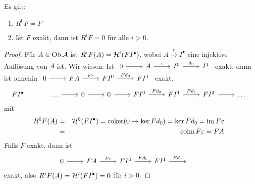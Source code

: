 \begin{bem}\label{8.2}
	Es gilt:
	\begin{enumerate}[label= \alph*)]
		\item $R^0F=F$
		\item Ist $F$ exakt, dann ist $R^iF=0$ für alle $i >0$.
	\end{enumerate}
\end{bem}
\begin{proof}
	Für $A\in \text{Ob}\,\mathcal{A}$ ist $R^iF(A) = \mathcal{H}^i(FI^\bullet)$, wobei $A\xrightarrow{\epsilon} I^\bullet$ eine injektive Auflösung von $A$ ist. Wir wissen: Ist $\begin{tikzcd}
	0 \arrow{r} & A \arrow{r}{\epsilon} & I^0 \arrow{r}{d_0} & I^1
	\end{tikzcd}$ exakt, dann ist ohnehin $\begin{tikzcd}
	0 \arrow{r} & FA \arrow{r}{F\epsilon} & FI^0 \arrow{r}{Fd_0} & FI^1
	\end{tikzcd}$ exakt.
	$$\begin{tikzcd}
	FI^\bullet: & \ldots \arrow{r} & 0 \arrow{r} & 0 \arrow{r}& FI^0 \arrow{r}{Fd_0} & FI^1\arrow{r}{Fd_1}& FI^2\arrow{r} & \ldots
	\end{tikzcd}$$
	mit \begin{eqnarray*}
		R^0F(A) &=& \mathcal{H}^0(FI^\bullet) = \operatorname{coker}(0 \rightarrow \ker Fd_0) = \ker Fd_0
		= \operatorname{im} F\varepsilon\\
		&=& \operatorname{coim} F\varepsilon = FA
	\end{eqnarray*}
	Falls $F$ exakt, dann ist 
	$$\begin{tikzcd}
	0\arrow{r} & FA \arrow{r}{F\epsilon} & FI^0 \arrow{r}{Fd_0} & FI^1\arrow{r}{Fd_1}& \ldots
	\end{tikzcd}$$
	exakt, also $R^iF(A) = \mathcal{H}^i(FI^\bullet) = 0$ für $i>0$.
\end{proof}

